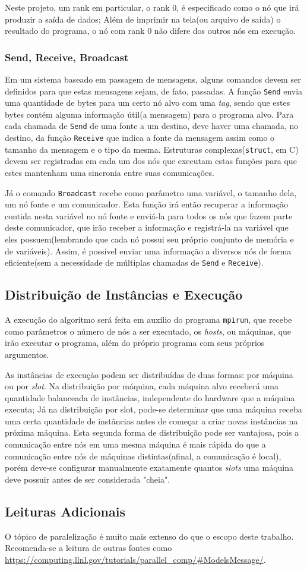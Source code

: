 Neste projeto, um rank em particular, o rank $0$, é especificado como o nó que irá produzir a saída de dados; Além de imprimir na tela(ou arquivo de saída) o resultado do programa, o nó com rank 0 não difere dos outros nós em execução.

\subsubsection{Send, Receive, Broadcast}
Em um sistema baseado em passagem de mensagens, alguns comandos devem ser definidos para que estas mensagens sejam, de fato, passadas. A função \texttt{Send} envia uma quantidade de bytes para um certo nó alvo com uma \textit{tag}, sendo que estes bytes contém alguma informação útil(a mensagem) para o programa alvo. Para cada chamada de \texttt{Send} de uma fonte a um destino, deve haver uma chamada, no destino, da função \texttt{Receive} que indica a fonte da mensagem assim como o tamanho da mensagem e o tipo da mesma. Estruturas complexas(\texttt{struct}, em C) devem ser registradas em cada um dos nós que executam estas funções para que estes mantenham uma sincronia entre suas comunicações.

Já o comando \texttt{Broadcast} recebe como parâmetro uma variável, o tamanho dela, um nó fonte e um comunicador. Esta função irá então recuperar a informação contida nesta variável no nó fonte e enviá-la para todos os nós que fazem parte deste comunicador, que irão receber a informação e registrá-la na variável que eles possuem(lembrando que cada nó possui seu próprio conjunto de memória e de variáveis). Assim, é possível enviar uma informação a diversos nós de forma eficiente(sem a necessidade de múltiplas chamadas de \texttt{Send} e \texttt{Receive}).

\subsection{Distribuição de Instâncias e Execução}
A execução do algoritmo será feita em auxílio do programa \texttt{mpirun}, que recebe como parâmetros o número de nós a ser executado, os \textit{hosts}, ou máquinas, que irão executar o programa, além do próprio programa com seus próprios argumentos.

As instâncias de execução podem ser distribuídas de duas formas: por máquina ou por \textit{slot}. Na distribuição por máquina, cada máquina alvo receberá uma quantidade balanceada de instâncias, independente do hardware que a máquina executa; Já na distribuição por slot, pode-se determinar que uma máquina receba uma certa quantidade de instâncias antes de começar a criar novas instâncias na próxima máquina. Esta segunda forma de distribuição pode ser vantajosa, pois a comunicação entre nós em uma mesma máquina é mais rápida do que a comunicação entre nós de máquinas distintas(afinal, a comunicação é local), porém deve-se configurar manualmente exatamente quantos \textit{slots} uma máquina deve possuir antes de ser considerada "cheia".


\subsection{Leituras Adicionais}
O tópico de paralelização é muito mais extenso do que o escopo deste trabalho. Recomenda-se a leitura de outras fontes como \url{https://computing.llnl.gov/tutorials/parallel\_comp/#ModelsMessage/}\cite{parallelcomp:website}.
